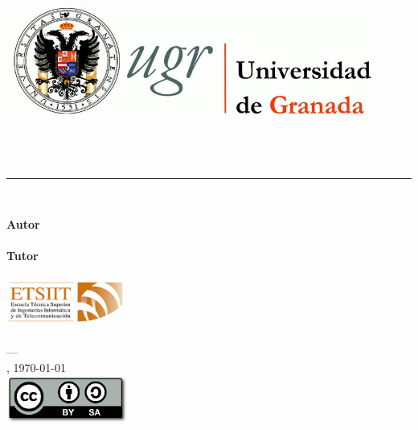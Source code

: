\begin{titlepage}

\newlength{\centeroffset}
\setlength{\centeroffset}{-0.5\oddsidemargin}
\addtolength{\centeroffset}{0.5\evensidemargin}

\noindent\hspace*{\centeroffset}\begin{minipage}{\textwidth}

\centering
\includegraphics[width=0.9\textwidth]{../images/logo_ugr.png}\\[1.4cm]

\textsc{\Large\asunto\\[0.2cm]}
\textsc{\titulacion}\\[1cm]

{\Huge\bfseries \titulo\\}
\noindent\rule[-1ex]{\textwidth}{3pt}\\[3.5ex]
\end{minipage}

\vspace{2cm}
\noindent\hspace*{\centeroffset}\begin{minipage}{\textwidth}
\centering

\textbf{Autor}\\ {\autor}\\[2.5ex]
\textbf{Tutor}\\ {\tutor}\\[2cm]
\includegraphics[width=0.3\textwidth]{../images/logo_etsiit.png}\\[0.1cm]
\textsc{\escuela}\\
\textsc{---}\\
\ciudad, \today\\
\includegraphics[width=0.3\textwidth]{../images/CC-SA-logo.png}
\end{minipage}
\end{titlepage}